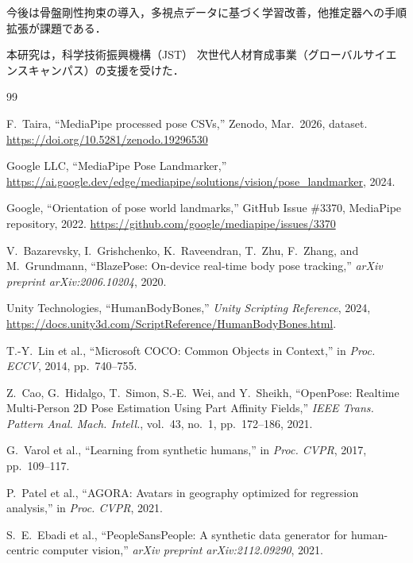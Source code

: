\documentclass[fleqn]{ieej}
\begin{document}
今後は骨盤剛性拘束の導入，多視点データに基づく学習改善，他推定器への手順拡張が課題である．


\acknowledgment

本研究は，科学技術振興機構（JST）
次世代人材育成事業（グローバルサイエンスキャンパス）の支援を受けた．


\begin{thebibliography}{99}

F.~Taira, ``MediaPipe processed pose CSVs,'' Zenodo, Mar.~2026, dataset.
\url{https://doi.org/10.5281/zenodo.19296530}

Google LLC, ``MediaPipe Pose Landmarker,''
\url{https://ai.google.dev/edge/mediapipe/solutions/vision/pose_landmarker},
2024.

Google, ``Orientation of pose world landmarks,''
GitHub Issue \#3370, MediaPipe repository, 2022.
\url{https://github.com/google/mediapipe/issues/3370}

V.~Bazarevsky, I.~Grishchenko, K.~Raveendran, T.~Zhu, F.~Zhang,
and M.~Grundmann,
``BlazePose: On-device real-time body pose tracking,''
\textit{arXiv preprint arXiv:2006.10204}, 2020.

Unity Technologies, ``HumanBodyBones,''
\textit{Unity Scripting Reference}, 2024,
\url{https://docs.unity3d.com/ScriptReference/HumanBodyBones.html}.

T.-Y.~Lin et al.,
``Microsoft COCO: Common Objects in Context,''
in \textit{Proc. ECCV}, 2014, pp.~740--755.

Z.~Cao, G.~Hidalgo, T.~Simon, S.-E.~Wei, and Y.~Sheikh,
``OpenPose: Realtime Multi-Person 2D Pose Estimation Using Part Affinity
Fields,''
\textit{IEEE Trans. Pattern Anal. Mach. Intell.}, vol.~43, no.~1,
pp.~172--186, 2021.

G.~Varol et al.,
``Learning from synthetic humans,''
in \textit{Proc. CVPR}, 2017, pp.~109--117.

P.~Patel et al.,
``AGORA: Avatars in geography optimized for regression analysis,''
in \textit{Proc. CVPR}, 2021.

S.~E.~Ebadi et al.,
``PeopleSansPeople: A synthetic data generator for human-centric
computer vision,''
\textit{arXiv preprint arXiv:2112.09290}, 2021.


\end{thebibliography}
\end{document}
